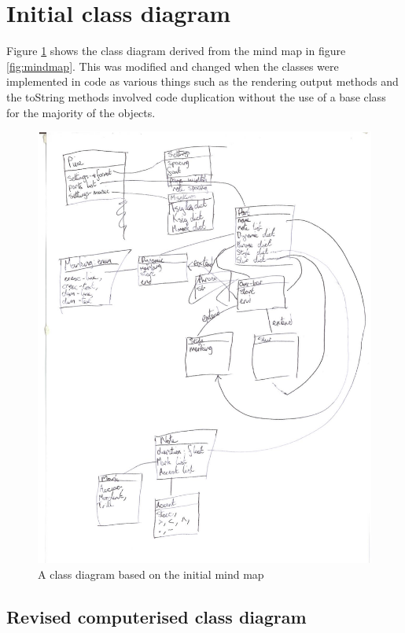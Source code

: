 \begin{appendices}
\section{Initial class diagram}
Figure \ref{fig:handclass} shows the class diagram derived from the mind map in figure \ref{fig:mindmap}. This was modified and changed when the classes were implemented in code as various things such as the rendering output methods and the toString methods involved code duplication without the use of a base class for the majority of the objects.
\begin{figure}[H]
\centering
\includegraphics[width=400pt]{class-diagram}
\caption{A class diagram based on the initial mind map}
\label{fig:handclass}
\end{figure}
\begin{landscape}
\section{Revised computerised class diagram}

\end{landscape}
\end{appendices}
